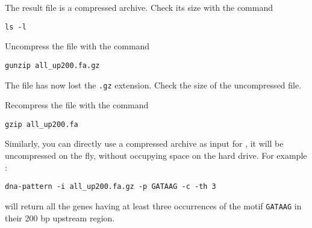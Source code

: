 The result file is a compressed archive. Check its size with the
command 
\begin{verbatim}
ls -l
\end{verbatim}

Uncompress the file with the command 
\begin{verbatim}
gunzip all_up200.fa.gz
\end{verbatim}

The file has now lost the \texttt{.gz} extension. Check the size of the
uncompressed file.

Recompress the file with the command
\begin{verbatim}
gzip all_up200.fa
\end{verbatim}

Similarly, you can directly use a compressed archive as input for
\RSAT, it will be uncompressed on the fly, without occupying space on
the hard drive. For example :

\begin{verbatim}
dna-pattern -i all_up200.fa.gz -p GATAAG -c -th 3
\end{verbatim}

will return all the genes having at least three occurrences of the
motif \texttt{GATAAG} in their 200 bp upstream region.
